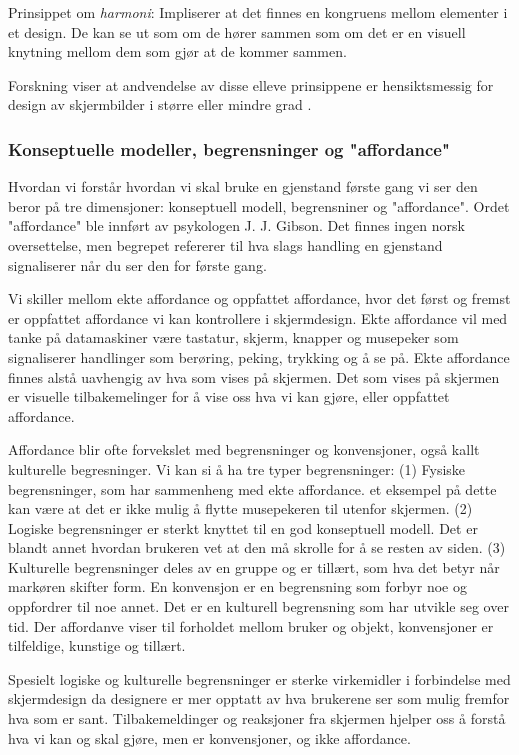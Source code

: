 \noindent
Prinsippet om \emph{harmoni}: Impliserer at det finnes en kongruens mellom elementer i et design. De kan se ut som om de hører sammen som om det er en visuell knytning mellom dem som gjør at de kommer sammen.

\noindent
Forskning viser at andvendelse av disse elleve prinsippene er hensiktsmessig for design av skjermbilder i større eller mindre grad \cite{Chang02}.

\noindent
\subsubsection{Konseptuelle modeller, begrensninger og "affordance"}

\noindent
Hvordan vi forstår hvordan vi skal bruke en gjenstand første gang vi ser den beror på tre dimensjoner: konseptuell modell, begrensniner og "affordance". Ordet "affordance" ble innført av psykologen J. J. Gibson. Det finnes ingen norsk oversettelse, men begrepet refererer til hva slags handling en gjenstand signaliserer når du ser den for første gang.\cite{Norman99}

\noindent
Vi skiller mellom ekte affordance og oppfattet affordance, hvor det først og fremst er oppfattet affordance vi kan kontrollere i skjermdesign. Ekte affordance vil med tanke på datamaskiner være tastatur, skjerm, knapper og musepeker som signaliserer handlinger som berøring, peking, trykking og å se på. Ekte affordance finnes alstå uavhengig av hva som vises på skjermen. Det som vises på skjermen er visuelle tilbakemelinger for å vise oss hva vi kan gjøre, eller oppfattet affordance.\cite{Norman99}

\noindent
Affordance blir ofte forvekslet med begrensninger og konvensjoner, også kallt kulturelle begresninger. Vi kan si å ha tre typer begrensninger: (1) Fysiske begrensninger, som har sammenheng med ekte affordance. et eksempel på dette kan være at det er ikke mulig å flytte musepekeren til utenfor skjermen. (2) Logiske begrensninger er sterkt knyttet til en god konseptuell modell. Det er blandt annet hvordan brukeren vet at den må skrolle for å se resten av siden. (3) Kulturelle begrensninger deles av en gruppe og er tillært, som hva det betyr når markøren skifter form. En konvensjon er en begrensning som forbyr noe og oppfordrer til noe annet. Det er en kulturell begrensning som har utvikle seg over tid. Der affordanve viser til forholdet mellom bruker og objekt, konvensjoner er tilfeldige, kunstige og tillært.\cite{Norman99}

\noindent
Spesielt logiske og kulturelle begrensninger er sterke virkemidler i forbindelse med skjermdesign da designere er mer opptatt av hva brukerene ser som mulig fremfor hva som er sant. Tilbakemeldinger og reaksjoner fra skjermen hjelper oss å forstå hva vi kan og skal gjøre, men er konvensjoner, og ikke affordance.\cite{Norman99}